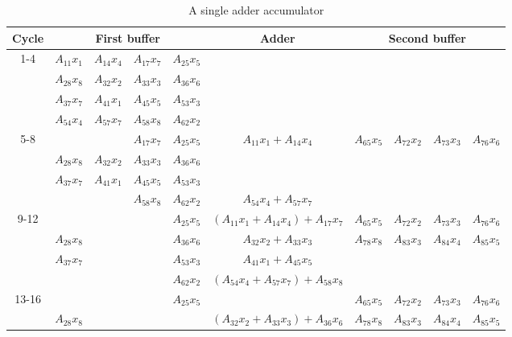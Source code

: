 \begin{sidewaystable}
    \centering
    \caption{A single adder accumulator}
    \label{tbl:single_adder}
    \begin{tabular}{|c||c|c|c|c||c||c|c|c|c|}
        \hline
        Cycle & \multicolumn{4}{c||}{First buffer} & Adder & \multicolumn{4}{c|}{Second buffer} \\
        \hline
        \hline
        \multirow{4}{*}{1-4} & $A_{11}x_1$ & $A_{14}x_4$ & $A_{17}x_7$ & $A_{25}x_5$ & & & & & \\
        \cline{2-10}
        & $A_{28}x_8$ & $A_{32}x_2$ & $A_{33}x_3$ & $A_{36}x_6$ & & & & & \\
        \cline{2-10}
        & $A_{37}x_7$ & $A_{41}x_1$ & $A_{45}x_5$ & $A_{53}x_3$ & & & & & \\
        \cline{2-10}
        & $A_{54}x_4$ & $A_{57}x_7$ & $A_{58}x_8$ & $A_{62}x_2$ & & & & & \\
        \hline
        \hline
        \multirow{4}{*}{5-8} & & & $A_{17}x_7$ & $A_{25}x_5$ & $A_{11}x_1 + A_{14}x_4$ & $A_{65}x_5$ & $A_{72}x_2$ & $A_{73}x_3$ & $A_{76}x_6$ \\
        \cline{2-10}
        & $A_{28}x_8$ & $A_{32}x_2$ & $A_{33}x_3$ & $A_{36}x_6$ & & & & & \\
        \cline{2-10}
        & $A_{37}x_7$ & $A_{41}x_1$ & $A_{45}x_5$ & $A_{53}x_3$ & & & & & \\
        \cline{2-10}
        & & & $A_{58}x_8$ & $A_{62}x_2$ & $A_{54}x_4 + A_{57}x_7$ & & & & \\
        \hline
        \hline
        \multirow{4}{*}{9-12} & & & & $A_{25}x_5$ & $\left(A_{11}x_1 + A_{14}x_4\right) + A_{17}x_7$ & $A_{65}x_5$ & $A_{72}x_2$ & $A_{73}x_3$ & $A_{76}x_6$ \\
        \cline{2-10}
        & $A_{28}x_8$ & & & $A_{36}x_6$ & $A_{32}x_2 + A_{33}x_3$ & $A_{78}x_8$ & $A_{83}x_3$ & $A_{84}x_4$ & $A_{85}x_5$\\
        \cline{2-10}
        & $A_{37}x_7$ & & & $A_{53}x_3$ & $A_{41}x_1 + A_{45}x_5$ & & & & \\
        \cline{2-10}
        & & & & $A_{62}x_2$ & $\left(A_{54}x_4 + A_{57}x_7\right) + A_{58}x_8$ & & & & \\
        \hline
        \hline
        \multirow{4}{*}{13-16} & & & & $A_{25}x_5$ & & $A_{65}x_5$ & $A_{72}x_2$ & $A_{73}x_3$ & $A_{76}x_6$ \\
        \cline{2-10}
        & $A_{28}x_8$ & & & & $\left(A_{32}x_2 + A_{33}x_3\right) + A_{36}x_6$ & $A_{78}x_8$ & $A_{83}x_3$ & $A_{84}x_4$ & $A_{85}x_5$\\

\end{tabular}
\end{sidewaystable}
